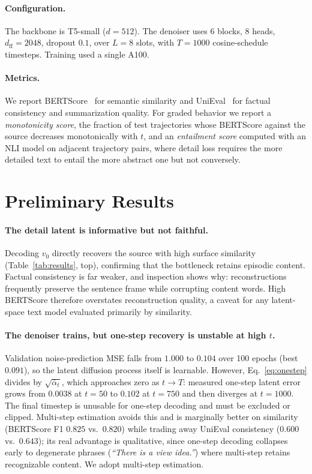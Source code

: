 \documentclass{article}
\begin{document}
\paragraph{Configuration.}
The backbone is T5-small ($d{=}512$). The denoiser uses $6$ blocks, $8$ heads, $d_{\text{ff}}{=}2048$, dropout $0.1$, over $L{=}8$ slots, with $T{=}1000$ cosine-schedule timesteps. Training used a single A100.

\paragraph{Metrics.}
We report BERTScore~\citep{zhang2020} for semantic similarity and UniEval~\citep{zhong2022} for factual consistency and summarization quality. For graded behavior we report a \emph{monotonicity score}, the fraction of test trajectories whose BERTScore against the source decreases monotonically with $t$, and an \emph{entailment score} computed with an NLI model on adjacent trajectory pairs, where detail loss requires the more detailed text to entail the more abstract one but not conversely.

\section{Preliminary Results}
\label{sec:results}

\paragraph{The detail latent is informative but not faithful.}
Decoding $v_0$ directly recovers the source with high surface similarity (Table~\ref{tab:results}, top), confirming that the bottleneck retains episodic content. Factual consistency is far weaker, and inspection shows why: reconstructions frequently preserve the sentence frame while corrupting content words. High BERTScore therefore overstates reconstruction quality, a caveat for any latent-space text model evaluated primarily by similarity.

\paragraph{The denoiser trains, but one-step recovery is unstable at high $t$.}
Validation noise-prediction MSE falls from $1.000$ to $0.104$ over 100 epochs (best $0.091$), so the latent diffusion process itself is learnable. However, Eq.~\ref{eq:onestep} divides by $\sqrt{\bar\alpha_t}$, which approaches zero as $t \to T$: measured one-step latent error grows from $0.0038$ at $t{=}50$ to $0.102$ at $t{=}750$ and then diverges at $t{=}1000$. The final timestep is unusable for one-step decoding and must be excluded or clipped. Multi-step estimation avoids this and is marginally better on similarity (BERTScore F1 $0.825$ vs.\ $0.820$) while trading away UniEval consistency ($0.600$ vs.\ $0.643$); its real advantage is qualitative, since one-step decoding collapses early to degenerate phrases (\emph{``There is a view idea.''}) where multi-step retains recognizable content. We adopt multi-step estimation.
\end{document}
